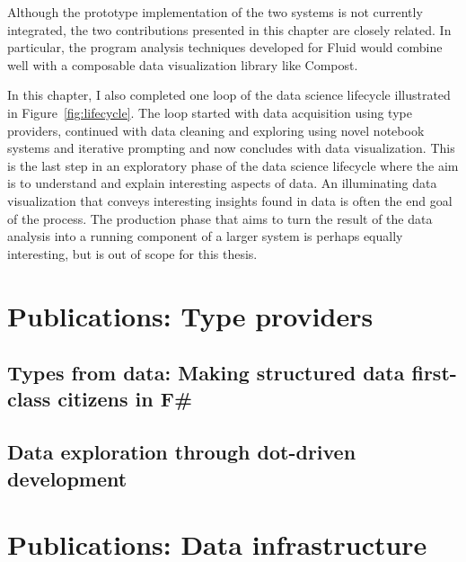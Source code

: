 \documentclass[fleqn,11pt]{report}
\theoremstyle{definition}
\begin{document}
Although the prototype implementation of the two systems is not currently integrated, the
two contributions presented in this chapter are closely related. In particular, the program
analysis techniques developed for Fluid would combine well with a composable data visualization
library like Compost.

In this chapter, I also completed one loop of the data science lifecycle illustrated in
Figure~\ref{fig:lifecycle}. The loop started with data acquisition using type providers,
continued with data cleaning and exploring using novel notebook systems and iterative prompting
and now concludes with data visualization. This is the last step in an exploratory phase of
the data science lifecycle where the aim is to understand and explain interesting aspects of data.
An illuminating data visualization that conveys interesting insights found in data is often
the end goal of the process. The production phase that aims to turn the result of the data
analysis into a running component of a larger system is perhaps equally interesting, but
is out of scope for this thesis.


\nobibliography*

\part{Publications: Type providers}
\label{part:providers}

\chapter{Types from data: Making structured data first-class citizens in F\#}
\label{ch:fsdata}


\chapter{Data exploration through dot-driven development}
\label{ch:dotdriven}


\part{Publications: Data infrastructure}
\label{part:infra}
\end{document}
